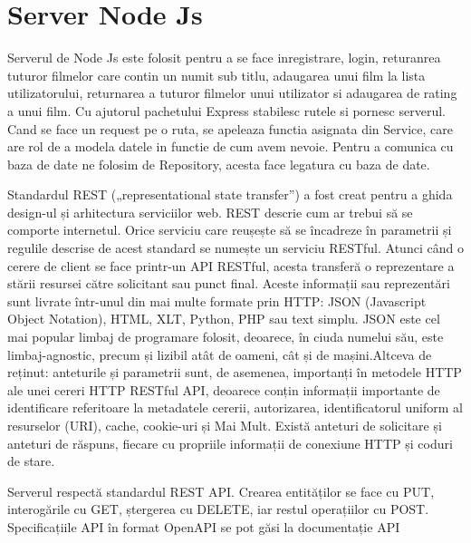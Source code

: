 \section{Server Node Js}
\label{sec:ch5sec1}

\par Serverul de Node Js este folosit pentru a se face inregistrare, login, returanrea tuturor filmelor care contin un numit sub titlu, adaugarea unui film la lista utilizatorului, returnarea a tuturor filmelor unui utilizator si adaugarea de rating a unui film. Cu ajutorul pachetului Express stabilesc rutele si pornesc serverul. Cand se face un request pe o ruta, se apeleaza functia asignata din Service, care are rol de a modela datele in functie de cum avem nevoie. Pentru a comunica cu baza de date ne folosim de Repository, acesta face legatura cu baza de date.
\par Standardul REST („representational state transfer”) a fost creat pentru a ghida design-ul și  arhitectura serviciilor web. REST descrie cum ar trebui să se comporte internetul. Orice serviciu care reușește să se încadreze în parametrii și regulile descrise de acest standard se numește un serviciu RESTful. Atunci când o cerere de client se face printr-un API RESTful, acesta transferă o reprezentare a 
stării resursei către solicitant sau punct final. Aceste informații sau reprezentări sunt livrate într-unul din mai multe formate prin HTTP: JSON (Javascript Object Notation), HTML, XLT, Python, PHP sau text simplu. JSON este cel mai popular limbaj de programare folosit, deoarece, în ciuda numelui său, este limbaj-agnostic, precum și lizibil atât de oameni, cât și de mașini.Altceva de reținut: anteturile și parametrii sunt, de asemenea, importanți în metodele HTTP ale unei cereri HTTP RESTful API, deoarece conțin informații importante de identificare referitoare la metadatele cererii, autorizarea, identificatorul uniform al resurselor (URI), cache, cookie-uri și 
Mai Mult. Există anteturi de solicitare și anteturi de răspuns, fiecare cu propriile informații de  conexiune HTTP și coduri de stare.
\par Serverul respectă standardul REST API. Crearea entităților se face cu PUT, interogările cu GET, ștergerea cu DELETE, iar restul operațiilor cu POST. Specificațiile API în format OpenAPI se pot găsi la documentație API

